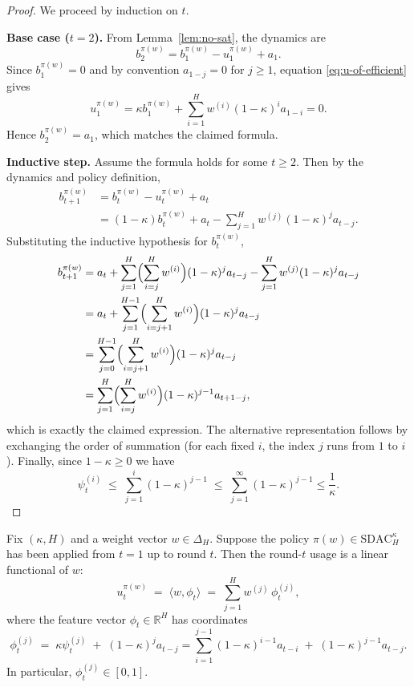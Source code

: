 \begin{proof}
We proceed by induction on \(t\).

\textbf{Base case (\(t=2\)).}
From Lemma~\ref{lem:no-sat}, the dynamics are
\[
b_2^{\pi(w)} = b_1^{\pi(w)} - u_1^{\pi(w)} + a_1.
\]
Since \(b_1^{\pi(w)}=0\) and by convention \(a_{1-j}=0\) for \(j\ge 1\), equation \eqref{eq:u-of-efficient} gives
\[
u_1^{\pi(w)} = \kappa b_1^{\pi(w)} + \sum_{i=1}^H w^{(i)} (1-\kappa)^i a_{1-i} = 0.
\]
Hence \(b_2^{\pi(w)} = a_1\), which matches the claimed formula.

\textbf{Inductive step.}
Assume the formula holds for some \(t \ge 2\). Then by the dynamics and policy definition,
\begin{align*}
b_{t+1}^{\pi(w)}
&= b_t^{\pi(w)} - u_t^{\pi(w)} + a_t \\
&= (1-\kappa)b_t^{\pi(w)} + a_t - \sum_{j=1}^H w^{(j)} (1-\kappa)^j a_{t-j}.
\end{align*}
Substituting the inductive hypothesis for \(b_t^{\pi(w)}\),
\begin{align*}
b_{t+1}^{\pi(w)}
&= a_t
+ \sum_{j=1}^{H} \Bigl(\sum_{i=j}^H w^{(i)}\Bigr) (1-\kappa)^{j} a_{t-j}
- \sum_{j=1}^H w^{(j)} (1-\kappa)^j a_{t-j} \\
&= a_t
+ \sum_{j=1}^{H-1} \Bigl(\sum_{i=j+1}^H w^{(i)}\Bigr) (1-\kappa)^j a_{t-j} \\
&= \sum_{j=0}^{H-1} \Bigl(\sum_{i=j+1}^H w^{(i)}\Bigr) (1-\kappa)^j a_{t-j} \\
&= \sum_{j=1}^{H} \Bigl(\sum_{i=j}^H w^{(i)}\Bigr) (1-\kappa)^{j-1} a_{t+1-j},
\end{align*}
which is exactly the claimed expression.  
The alternative representation follows by exchanging the order of summation (for each fixed \(i\), the index \(j\) runs from \(1\) to \(i\)).  
Finally, since $1-\kappa \geq 0$ we have
\[
\psi_t^{(i)} \;\le\; \sum_{j=1}^i (1-\kappa)^{j-1} \;\le\; \sum_{j=1}^\infty (1-\kappa)^{j-1} \le \frac{1}{\kappa}.
\]
\end{proof}




\begin{Thm:Lemma}
\label{lem:prefix-linear}
Fix \((\kappa,H)\) and a weight vector \(w\in\Delta_H\).  
Suppose the policy \(\pi(w)\in\mathrm{SDAC}_H^\kappa\) has been applied from \(t=1\) up to round \(t\).  
Then the round-\(t\) usage is a linear functional of \(w\):
\[
u_t^{\pi(w)} \;=\; \langle w,\phi_t\rangle \;=\; \sum_{j=1}^H w^{(j)}\, \phi_t^{(j)},
\]
where the feature vector \(\phi_t\in\mathbb{R}^H\) has coordinates
\[
\phi_t^{(j)} \;=\; \kappa \psi_t^{(j)} \;+\; (1-\kappa)^j a_{t-j}
= \sum_{i=1}^{j-1} (1-\kappa)^{i-1} a_{t-i} \;+\; (1-\kappa)^{j-1} a_{t-j}.
\]
In particular, \(\phi_t^{(j)} \in [0,1]\).
\end{Thm:Lemma}


